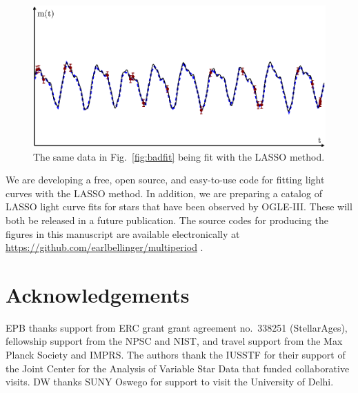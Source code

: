 \documentclass[11pt,twoside]{book}
\begin{document}
\begin{figure}[!t]
    \centering
    \includegraphics[width=\textwidth]{bellinger-fig2.eps}
    \caption{The same data in Fig.~\ref{fig:badfit} being fit with the LASSO method.}%
    \label{fig:goodfit} 
\end{figure}

We are developing a free, open source, and easy-to-use code for fitting light curves with the LASSO method. In addition, we are preparing a catalog of LASSO light curve fits for stars that have been observed by OGLE-III. These will both be released in a future publication. The source codes for producing the figures in this manuscript are available electronically at \url{https://github.com/earlbellinger/multiperiod} \citep{bellinger2015lasso}.

\section*{Acknowledgements}
EPB thanks support from ERC grant grant agreement no.~338251 (StellarAges), fellowship support from the NPSC and NIST, and travel support from the Max Planck Society and IMPRS. The authors thank the IUSSTF for their support of the Joint Center for the Analysis of Variable Star Data that funded collaborative visits. DW thanks SUNY Oswego for support to visit the University of Delhi. 
\end{document}
